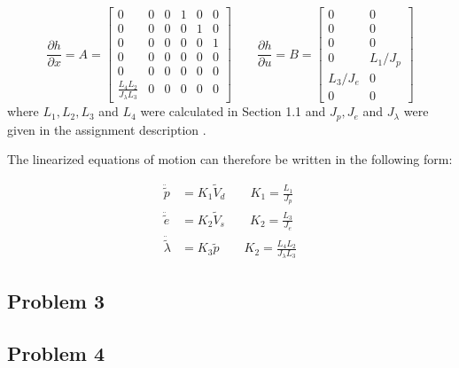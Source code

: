 \begin{equation}
  \frac{\partial h}{\partial x} = A =
  \begin{bmatrix}
    0 & 0 & 0 & 1 & 0 & 0 \\
    0 & 0 & 0 & 0 & 1 & 0 \\
    0 & 0 & 0 & 0 & 0 & 1 \\
    0 & 0 & 0 & 0 & 0 & 0 \\
    0 & 0 & 0 & 0 & 0 & 0 \\
    \frac{L_4L_2}{J_\lambda L_3} & 0 & 0 & 0 & 0 & 0
  \end{bmatrix}
  \qquad
  \frac{\partial h}{\partial u} = B =
  \begin{bmatrix}
    0 & 0 \\
    0 & 0 \\
    0 & 0 \\
    0 & L_1/J_p \\
    L_3/J_e & 0 \\
    0 & 0
  \end{bmatrix}
\end{equation}
where $L_1, L_2, L_3$ and $L_4$ were calculated in Section 1.1
 and $J_p, J_e$ and $J_\lambda$ were given in
the assignment description .

The linearized equations of motion can therefore be written in the
following form:

\begin{subequations}
  \begin{align}
    \ddot{\tilde{p}} &= K_1\tilde{V}_d \qquad K_1 = \frac{L_1}{J_p}\\
    \ddot{\tilde{e}} &= K_2\tilde{V}_s \qquad K_2 = \frac{L_3}{J_e}\\
    \ddot{\tilde{\lambda}} &= K_3\tilde{p} \qquad K_2 = \frac{L_4L_2}{J_\lambda L_3}
  \end{align}
\end{subequations}
\subsection{Problem 3}
\subsection{Problem 4}
